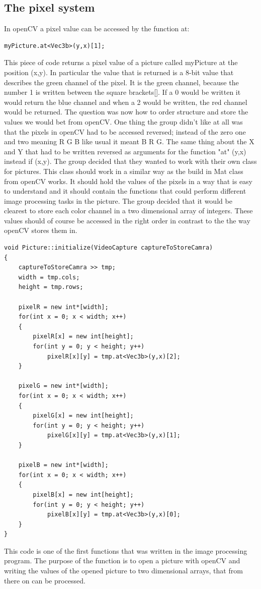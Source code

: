 \subsection{The pixel system}
In openCV a pixel value can be accessed by the function at:
\begin{lstlisting}
myPicture.at<Vec3b>(y,x)[1];
\end{lstlisting}
This piece of code returns a pixel value of a picture called myPicture at the position (x,y). In particular the value that is returned is a 8-bit value that describes the green channel of the pixel. It is the green channel, because the number 1 is written between the square brackets[]. If a 0 would be written it would return the blue channel and when a 2 would be written, the red channel would be returned.
The question was now how to order structure and store the values we would bet from openCV. One thing the group didn't like at all was that the pixels in openCV had to be accessed reversed; instead of the zero one and two meaning R G B like usual it meant B R G. The same thing about the X and Y that had to be written reversed as arguments for the function "at" (y,x) instead if (x,y).
The group decided that they wanted to work with their own class for pictures. This class should work in a similar way as the build in Mat class from openCV works. It should hold the values of the pixels in a way that is easy to understand and it should contain the functions that could perform different image processing tasks in the picture.
The group decided that it would be clearest to store each color channel in a two dimensional array of integers. These values should of course be accessed in the right order in contrast to the the way openCV stores them in.
\begin{lstlisting}
void Picture::initialize(VideoCapture captureToStoreCamra)
{
	captureToStoreCamra >> tmp;
	width = tmp.cols;
	height = tmp.rows;

	pixelR = new int*[width];
	for(int x = 0; x < width; x++)
	{
		pixelR[x] = new int[height];
		for(int y = 0; y < height; y++)
			pixelR[x][y] = tmp.at<Vec3b>(y,x)[2];
	}

	pixelG = new int*[width];
	for(int x = 0; x < width; x++)
	{
		pixelG[x] = new int[height];
		for(int y = 0; y < height; y++)
			pixelG[x][y] = tmp.at<Vec3b>(y,x)[1];
	}

	pixelB = new int*[width];
	for(int x = 0; x < width; x++)
	{
		pixelB[x] = new int[height];
		for(int y = 0; y < height; y++)
			pixelB[x][y] = tmp.at<Vec3b>(y,x)[0];
	}
}
\end{lstlisting}
This code is one of the first functions that was written in the image processing program. The purpose of the function is to open a picture with openCV and writing the values of the opened picture to two dimensional arrays, that from there on can be processed.

